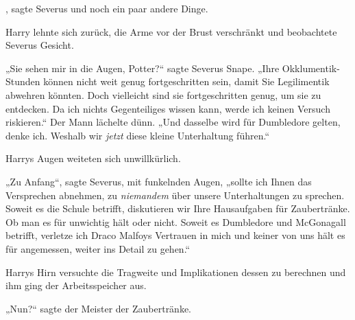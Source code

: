 , sagte Severus und noch ein paar andere Dinge.

Harry lehnte sich zurück, die Arme vor der Brust verschränkt und beobachtete Severus Gesicht.

„Sie sehen mir in die Augen, Potter?“ sagte Severus Snape. „Ihre Okklumentik-Stunden können nicht weit genug fortgeschritten sein, damit Sie Legilimentik abwehren könnten. Doch vielleicht sind sie fortgeschritten genug, um sie zu entdecken. Da ich nichts Gegenteiliges wissen kann, werde ich keinen Versuch riskieren.“ Der Mann lächelte dünn. „Und dasselbe wird für Dumbledore gelten, denke ich. Weshalb wir \emph{jetzt} diese kleine Unterhaltung führen.“

Harrys Augen weiteten sich unwillkürlich.

„Zu Anfang“, sagte Severus, mit funkelnden Augen, „sollte ich Ihnen das Versprechen abnehmen, zu \emph{niemandem} über unsere Unterhaltungen zu sprechen. Soweit es die Schule betrifft, diskutieren wir Ihre Hausaufgaben für Zaubertränke. Ob man es für unwichtig hält oder nicht. Soweit es Dumbledore und McGonagall betrifft, verletze ich Draco Malfoys Vertrauen in mich und keiner von uns hält es für angemessen, weiter ins Detail zu gehen.“

Harrys Hirn versuchte die Tragweite und Implikationen dessen zu berechnen und ihm ging der Arbeitsspeicher aus.

„Nun?“ sagte der Meister der Zaubertränke.


